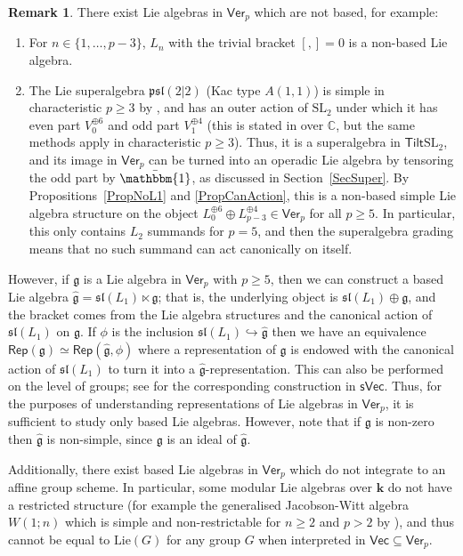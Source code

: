 \documentclass[11pt,a4paper,reqno]{amsart}
\theoremstyle{definition}
\newtheorem{remark}[theorem]{Remark}
\newcommand{\bk}{\mathbf{k}}
\numberwithin{equation}{section}
\newcommand{\Ver}{\mathsf{Ver}}
\newcommand{\Rep}{\mathsf{Rep}}
\newcommand{\unit}{{\mathbbm{1}}}
\newcommand{\mC}{\mathbb{C}}
\newcommand{\fg}{\mathfrak{g}}
\newcommand{\fsl}{\mathfrak{sl}}
\newcommand{\Lie}{\mathrm{Lie}}
\newcommand{\Vecc}{\mathsf{Vec}}
\newcommand{\sVec}{\mathsf{sVec}}
\newcommand{\Tilt}{\mathsf{Tilt}}
\newcommand{\SL}{\mathrm{SL}}
\begin{document}
\begin{remark}\label{RemBased}
There exist Lie algebras in $\Ver_p$ which are not based, for example:
\begin{enumerate}
\item For $n\in\{1,\dots,p-3\}$, $L_n$ with the trivial bracket $[,]=0$ is a non-based Lie algebra.
\item The Lie superalgebra $\mathfrak{psl}(2|2)$ (Kac type $A(1,1)$) is simple in characteristic $p\geq3$ by \cite[Lemma~2.7]{BZ}, and has an outer action of $\SL_2$ under which it has even part $V_0^{\oplus 6}$ and odd part $V_1^{\oplus 4}$ (this is stated in \cite[\S6.4]{GP} over $\mC$, but the same methods apply in characteristic $p\geq3$). Thus, it is a superalgebra in $\Tilt\SL_2$, and its image in $\Ver_p$ can be turned into an operadic Lie algebra by tensoring the odd part by $\bar\unit$, as discussed in Section~\ref{SecSuper}. By Propositions~\ref{PropNoL1} and \ref{PropCanAction}, this is a non-based simple Lie algebra structure on the object $L_0^{\oplus6}\oplus L_{p-3}^{\oplus4}\in\Ver_p$ for all $p\geq5$. In particular, this only contains $L_2$ summands for $p=5$, and then the superalgebra grading means that no such summand can act canonically on itself.
\end{enumerate}
However, if $\fg$ is a Lie algebra in $\Ver_p$ with $p\geq5$, then we can construct a based Lie algebra $\widehat{\fg}=\fsl(L_1)\ltimes\fg$; that is, the underlying object is $\fsl(L_1)\oplus\fg$, and the bracket comes from the Lie algebra structures and the canonical action of $\fsl(L_1)$ on $\fg$. If $\phi$ is the inclusion $\fsl(L_1)\hookrightarrow\widehat{\fg}$ then we have an equivalence $\Rep(\fg)\simeq\Rep(\widehat{\fg},\phi)$ where a representation of $\fg$ is endowed with the canonical action of $\fsl(L_1)$ to turn it into a $\widehat{\fg}$-representation. This can also be performed on the level of groups; see \cite[Example~0.4(ii)]{De} for the corresponding construction in $\sVec$. Thus, for the purposes of understanding representations of Lie algebras in $\Ver_p$, it is sufficient to study only based Lie algebras. However, note that if $\fg$ is non-zero then $\widehat{\fg}$ is non-simple, since $\fg$ is an ideal of $\widehat{\fg}$.

Additionally, there exist based Lie algebras in $\Ver_p$ which do not integrate to an affine group scheme. In particular, some modular Lie algebras over $\bk$ do not have a restricted structure (for example the generalised Jacobson-Witt algebra $W(1;n)$ which is simple and non-restrictable for $n\geq2$ and $p>2$ by \cite[Ch.~4 Theorem~2.4]{SF}), and thus cannot be equal to $\Lie(G)$ for any group $G$ when interpreted in $\Vecc\subseteq\Ver_p$.
\end{remark}
\end{document}

